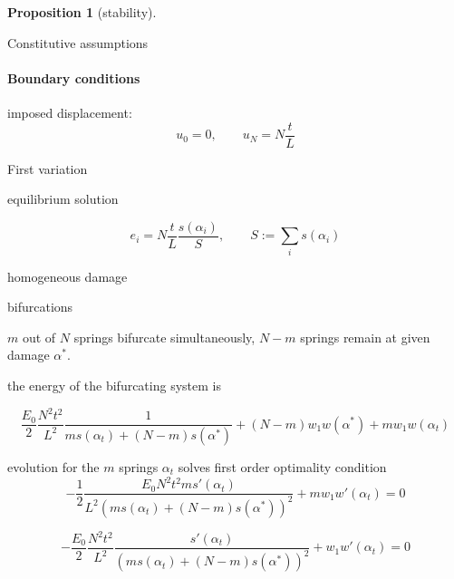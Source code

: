 \documentclass[]{article}
\newtheorem{prop}{Proposition}
\begin{document}
\begin{prop}[stability] 
        
\end{prop}

Constitutive assumptions

\paragraph{Boundary conditions}

imposed displacement:
\begin{equation}
    \label{eqn:}
    u_0 = 0, \qquad u_N = N\frac{t}{L}
\end{equation}

First variation

equilibrium solution

\begin{equation}
    \label{eqn:}
    e_i = N \frac{t}{L} \frac{s(\alpha_i)}{S}, \qquad S:=\sum_i s(\alpha_i)
\end{equation}

homogeneous damage

bifurcations


$m$ out of $N$ springs bifurcate simultaneously, $N-m$ springs remain at given damage $\alpha^*$. 

the energy of the bifurcating system is

\begin{equation}
    \label{eqn:}
    \frac{E_{0}}{2}\frac{N^{2} t^{2}}{L^{2}}
    \frac{1}{m s{\left(\alpha_{t} \right)} + \left(N - m\right) s{\left(\alpha^{*} \right)}} + (N-m) w_{1} w{\left(\alpha^{*} \right)} + m w_{1} w{\left(\alpha_{t} \right)}
\end{equation}

evolution for the $m$ springs $\alpha_t$ solves first order optimality condition
\begin{equation}
    \label{eqn:bifurcations}
    - \frac{1}{2}\frac{E_{0} N^{2} t^{2} m  s'{\left(\alpha_{t} \right)}}{L^{2} \left(m s{\left(\alpha_{t} \right)} + \left(N - m\right) s{\left(\alpha^{*} \right)}\right)^{2}} 
    + m w_{1} w'{\left(\alpha_{t} \right)} =0
\end{equation}


\begin{equation}
    \label{eqn:bifurcations}
    -\frac{E_{0}}{2}\frac{N^{2} t^{2}}{L^{2}} \frac{s'{\left(\alpha_{t} \right)}}{\left(m s{\left(\alpha_{t} \right)} + \left(N - m\right) s{\left(\alpha^{*} \right)}\right)^{2}} 
    + w_{1} w'{\left(\alpha_{t} \right)} =0
\end{equation}
\end{document}

